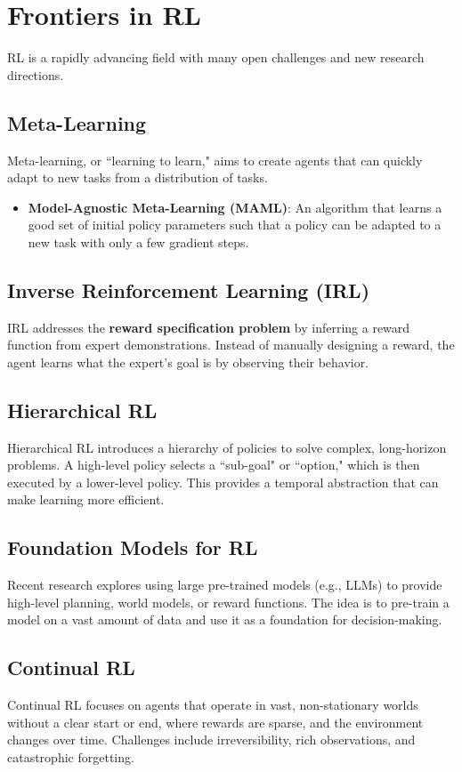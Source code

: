 \documentclass[12pt]{article}
\begin{document}
\section{Frontiers in RL }
RL is a rapidly advancing field with many open challenges and new research directions.

\subsection{Meta-Learning}
Meta-learning, or ``learning to learn," aims to create agents that can quickly adapt to new tasks from a distribution of tasks.
\begin{itemize}
    \item \textbf{Model-Agnostic Meta-Learning (MAML)}: An algorithm that learns a good set of initial policy parameters such that a policy can be adapted to a new task with only a few gradient steps.
\end{itemize}

\subsection{Inverse Reinforcement Learning (IRL)}
IRL addresses the \textbf{reward specification problem} by inferring a reward function from expert demonstrations. Instead of manually designing a reward, the agent learns what the expert's goal is by observing their behavior.

\subsection{Hierarchical RL}
Hierarchical RL introduces a hierarchy of policies to solve complex, long-horizon problems. A high-level policy selects a ``sub-goal" or ``option," which is then executed by a lower-level policy. This provides a temporal abstraction that can make learning more efficient.

\subsection{Foundation Models for RL}
Recent research explores using large pre-trained models (e.g., LLMs) to provide high-level planning, world models, or reward functions. The idea is to pre-train a model on a vast amount of data and use it as a foundation for decision-making.

\subsection{Continual RL}
Continual RL focuses on agents that operate in vast, non-stationary worlds without a clear start or end, where rewards are sparse, and the environment changes over time. Challenges include irreversibility, rich observations, and catastrophic forgetting.
\end{document}
